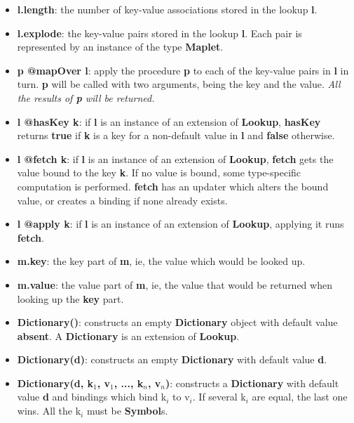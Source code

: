 \documentclass{report}
\begin{document}
\begin{itemize}\item {\bf l.length}: the number of key-value associations stored in the lookup {\bf l}.

\item {\bf l.explode}: the key-value pairs stored in the lookup {\bf l}. Each pair is
represented by an instance of the type {\bf Maplet}.

\item {\bf p @mapOver l}: apply the procedure {\bf p} to each of the key-value pairs in {\bf l}
in turn. {\bf p} will be called with two arguments, being the key and the value.
{\em All the results of {\bf p} will be returned.}

\item {\bf l @hasKey k}: if {\bf l} is an instance of an extension of {\bf Lookup}, {\bf hasKey}
returns {\bf true} if {\bf k} is a key for a non-default value in {\bf l} and {\bf false}
otherwise.

\item {\bf l @fetch k}: if {\bf l} is an instance of an extension of {\bf Lookup}, {\bf fetch} gets
the value bound to the key {\bf k}. If no value is bound, some type-specific
computation is performed. {\bf fetch} has an updater which alters the bound value,
or creates a binding if none already exists.

\item {\bf l @apply k}: if {\bf l} is an instance of an extension of {\bf Lookup}, applying it
runs {\bf fetch}.

\item {\bf m.key}: the key part of {\bf m}, ie, the value which would be looked up.

\item {\bf m.value}: the value part of {\bf m}, ie, the value that would be returned when
looking up the {\bf key} part.

\item {\bf Dictionary()}: constructs an empty {\bf Dictionary} object with default value
{\bf absent}. A {\bf Dictionary} is an extension of {\bf Lookup}.

\item {\bf Dictionary(d)}: constructs an empty {\bf Dictionary} with default value {\bf d}.

\item {\bf Dictionary(d, k$_ 1$, v$_ 1$, ..., k$_ n$, v$_ n$)}: constructs a {\bf Dictionary} with
default value {\bf d} and bindings which bind k$_ i$ to v$_ i$. If several k$_ i$ are
equal, the last one wins. All the k$_ i$ must be {\bf Symbol}s.


\end{itemize}
\end{document}

